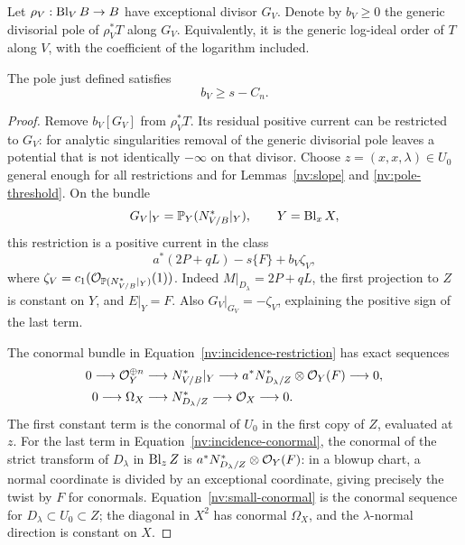 Let \(\rho_V:\operatorname{Bl}_VB\to B\) have exceptional divisor \(G_V\).  Denote
by \(b_V\ge0\) the generic divisorial pole of \(\rho_V^*T\) along
\(G_V\).  Equivalently, it is the generic log-ideal order of \(T\)
along \(V\), with the coefficient of the logarithm included.

\begin{lemma}\label{nv:incidence-pole}
The pole just defined satisfies
\begin{equation}\label{nv:pole-transfer}
 b_V\ge s-C_n .
\end{equation}
\end{lemma}

\begin{proof}
Remove \(b_V[G_V]\) from \(\rho_V^*T\).  Its residual positive current
can be restricted to \(G_V\): for analytic singularities removal of
the generic divisorial pole leaves a potential that is not identically
\(-\infty\) on that divisor.  Choose \(z=(x,x,\lambda)\in U_0\)
general enough for all restrictions and for
Lemmas~\ref{nv:slope} and \ref{nv:pole-threshold}.  On the bundle
\[
 G_V|_Y=\mathbb P_Y(N^*_{V/B}|_Y),\qquad Y=\operatorname{Bl}_xX,
\]
this restriction is a positive current in the class
\begin{equation}\label{nv:incidence-restriction}
 a^*(2P+qL)-s\{F\}+b_V\zeta_V ,
\end{equation}
where \(\zeta_V=c_1(\mathcal O_{\mathbb P(N^*_{V/B}|_Y)}(1))\).
Indeed \(M|_{D_\lambda}=2P+qL\), the first projection to \(Z\) is constant on
\(Y\), and \(E|_Y=F\).  Also \(G_V|_{G_V}=-\zeta_V\), explaining the
positive sign of the last term.

The conormal bundle in Equation~\eqref{nv:incidence-restriction} has exact
sequences
\begin{align}
 0\longrightarrow\mathcal O_Y^{\oplus n}
 &\longrightarrow N^*_{V/B}|_Y
 \longrightarrow a^*N^*_{D_\lambda/Z}\otimes\mathcal O_Y(F)
 \longrightarrow0,\label{nv:incidence-conormal}\\
 0\longrightarrow\Omega_X
 &\longrightarrow N^*_{D_\lambda/Z}
 \longrightarrow\mathcal O_X\longrightarrow0.\label{nv:small-conormal}
\end{align}
The first constant term is the conormal of \(U_0\) in the first copy of
\(Z\), evaluated at \(z\).  For the last term in
Equation~\eqref{nv:incidence-conormal}, the conormal of the strict transform of
\(D_\lambda\) in \(\operatorname{Bl}_zZ\) is
\(a^*N^*_{D_\lambda/Z}\otimes\mathcal O_Y(F)\): in a blowup chart, a normal
coordinate is divided by an exceptional coordinate, giving precisely
the twist by \(F\) for conormals.  Equation~\eqref{nv:small-conormal}
is the conormal sequence for
\(D_\lambda\subset U_0\subset Z\); the diagonal in \(X^2\) has conormal
\(\Omega_X\), and the \(\lambda\)-normal direction is constant on
\(X\).


\end{proof}
